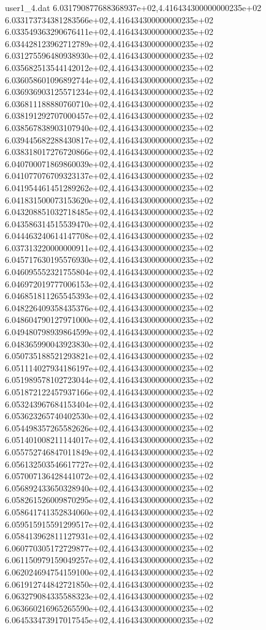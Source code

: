 \begin{filecontents}{user1_4.dat}
6.031790877688368937e+02,4.416434300000000235e+02
6.033173734381283566e+02,4.416434300000000235e+02
6.033549363290676411e+02,4.416434300000000235e+02
6.034428123962712789e+02,4.416434300000000235e+02
6.031275596480938930e+02,4.416434300000000235e+02
6.035682513544142012e+02,4.416434300000000235e+02
6.036058601096892744e+02,4.416434300000000235e+02
6.036936903125571234e+02,4.416434300000000235e+02
6.036811188880760710e+02,4.416434300000000235e+02
6.038191292707000457e+02,4.416434300000000235e+02
6.038567838903107940e+02,4.416434300000000235e+02
6.039445682288430817e+02,4.416434300000000235e+02
6.038318017276720866e+02,4.416434300000000235e+02
6.040700071869860039e+02,4.416434300000000235e+02
6.041077076709323137e+02,4.416434300000000235e+02
6.041954461451289262e+02,4.416434300000000235e+02
6.041831500073153620e+02,4.416434300000000235e+02
6.043208851032718485e+02,4.416434300000000235e+02
6.043586314515539470e+02,4.416434300000000235e+02
6.044463240614147708e+02,4.416434300000000235e+02
6.037313220000000911e+02,4.416434300000000235e+02
6.045717630195576930e+02,4.416434300000000235e+02
6.046095552321755804e+02,4.416434300000000235e+02
6.046972019777006153e+02,4.416434300000000235e+02
6.046851811265545393e+02,4.416434300000000235e+02
6.048226409358435376e+02,4.416434300000000235e+02
6.048604790127971000e+02,4.416434300000000235e+02
6.049480798939864599e+02,4.416434300000000235e+02
6.048365990043923830e+02,4.416434300000000235e+02
6.050735188521293821e+02,4.416434300000000235e+02
6.051114027934186197e+02,4.416434300000000235e+02
6.051989578102723044e+02,4.416434300000000235e+02
6.051872122457937166e+02,4.416434300000000235e+02
6.053243967684153404e+02,4.416434300000000235e+02
6.053623265740402530e+02,4.416434300000000235e+02
6.054498357265582626e+02,4.416434300000000235e+02
6.051401008211144017e+02,4.416434300000000235e+02
6.055752746847011849e+02,4.416434300000000235e+02
6.056132503546617727e+02,4.416434300000000235e+02
6.057007136428441072e+02,4.416434300000000235e+02
6.056892433650328940e+02,4.416434300000000235e+02
6.058261526009870295e+02,4.416434300000000235e+02
6.058641741352834060e+02,4.416434300000000235e+02
6.059515915591299517e+02,4.416434300000000235e+02
6.058413962811127931e+02,4.416434300000000235e+02
6.060770305172729877e+02,4.416434300000000235e+02
6.061150979159049257e+02,4.416434300000000235e+02
6.062024694754159100e+02,4.416434300000000235e+02
6.061912744842721850e+02,4.416434300000000235e+02
6.063279084335588323e+02,4.416434300000000235e+02
6.063660216965265590e+02,4.416434300000000235e+02
6.064533473917017545e+02,4.416434300000000235e+02

\end{filecontents}
